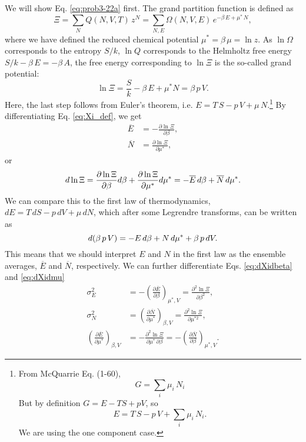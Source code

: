 \documentclass{article}
\begin{document}
We will show Eq. \eqref{eq:prob3-22a} first.
The grand partition function is defined as
\begin{equation}
\Xi
=
  \sum_{N} Q(N, V, T) \, z^N
=
  \sum_{N, E} \Omega(N, V, E) \, e^{-\beta \, E + \mu^* \, N}
,
  \label{eq:Xi_def}
\end{equation}
%
where we have defined the reduced chemical potential $\mu^* = \beta \, \mu = \ln z$.
%
As $\ln \Omega$ corresponds to the entropy $S/k$,
$\ln Q$ corresponds to the Helmholtz free energy $S/k - \beta \, E = -\beta \, A$,
the free energy corresponding to $\ln \Xi$
is the so-called grand potential:
%
\begin{equation}
  \ln \Xi
  = \frac{S}{k} - \beta \, E + \mu^* N
  = \beta \, p \, V
  .
  \label{eq:lnXi}
\end{equation}
Here, the last step follows from Euler's theorem,
i.e. $E = T \, S - p \, V + \mu \, N$.\footnote{
  From McQuarrie Eq. (1-60),
  $$
  G = \sum_i \mu_i \, N_i
  $$
  But by definition $G = E - TS + pV$, so
  $$
  E = T \, S - p \, V + \sum_i \mu_i \, N_i.
  $$
  We are using the one component case.
}
%
By differentiating Eq. \eqref{eq:Xi_def}, we get
%
\begin{align}
  \overline E &= -\frac{ \partial \ln \Xi } { \partial \beta }
  ,
  \label{eq:dXidbeta}
  \\
  \overline N &= \frac{ \partial \ln \Xi } { \partial \mu^* }
  ,
  \label{eq:dXidmu}
\end{align}
%
or
\begin{equation}
  d \ln \Xi
  =
  \frac{ \partial \ln \Xi } { \partial \beta } d\beta
  +
  \frac{ \partial \ln \Xi } { \partial \mu^* } d\mu^*
  = -\overline E \, d\beta + \overline N \, d\mu^*
  .
  \notag
\end{equation}
%
We can compare this to the first law of thermodynamics,
$dE = T \, dS - p \, dV + \mu \, dN$,
which after some Legrendre transforms, can be written as
%
\begin{equation}
  d(\beta \, p \, V) = -E \, d\beta + N \, d\mu^* + \beta \, p \, dV
  .
  \notag
\end{equation}
This means that we should interpret $E$ and $N$ in the first law
as the ensemble averages, $\overline E$ and $\overline N$, respectively.
%
We can further differentiate Eqs. \eqref{eq:dXidbeta} and \eqref{eq:dXidmu}
%
\begin{align}
  \sigma_E^2
  &=
  -\left( \frac{ \partial \overline E } { \partial \beta } \right)_{\mu^*, V}
  = \frac{ \partial^2 \ln \Xi } { \partial \beta^2 }
  ,
  \label{eq:varE}
  \\
  \sigma_N^2
  &= \left( \frac{ \partial \overline N } { \partial \mu^* } \right)_{\beta, V}
  = \frac{ \partial^2 \ln \Xi } { \partial \mu^{*2} }
  \label{eq:varN}
  ,
  \\
  \left( \frac{ \partial \overline E } { \partial \mu^* } \right)_{\beta, V}
  &= -\frac{ \partial^2 \ln \Xi } { \partial \mu^* \, \partial \beta }
  = - \left( \frac{ \partial \overline N } { \partial \beta } \right)_{\mu^*, V}
  \label{eq:covEN}
  .
\end{align}
\end{document}
